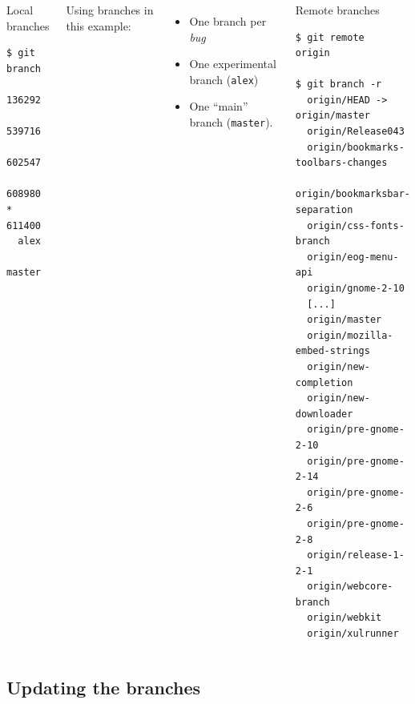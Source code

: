 \begin{frame}[fragile]
  \frametitle{\insertsubsection}

  \begin{columns}[t]
    \begin{block}{Local branches}
      \begin{tiny}
\begin{verbatim}
$ git branch
  136292
  539716
  602547
  608980
* 611400
  alex
  master
\end{verbatim}
\end{tiny}
    \end{block} \vspacing
    Using branches in this example:
    \begin{itemize}
    \item One branch per \textit{bug} \vspacing

    \item One experimental branch (\texttt{alex}) \vspacing

    \item One ``main'' branch (\texttt{master}).
    \end{itemize}

    \begin{block}{Remote branches}
      \begin{tiny}
\begin{verbatim}
$ git remote 
origin

$ git branch -r
  origin/HEAD -> origin/master
  origin/Release043
  origin/bookmarks-toolbars-changes
  origin/bookmarksbar-separation
  origin/css-fonts-branch
  origin/eog-menu-api
  origin/gnome-2-10
  [...]
  origin/master
  origin/mozilla-embed-strings
  origin/new-completion
  origin/new-downloader
  origin/pre-gnome-2-10
  origin/pre-gnome-2-14
  origin/pre-gnome-2-6
  origin/pre-gnome-2-8
  origin/release-1-2-1
  origin/webcore-branch
  origin/webkit
  origin/xulrunner
\end{verbatim}
\end{tiny}
    \end{block}
\end{columns}
\end{frame}


\subsection{Updating the branches}

